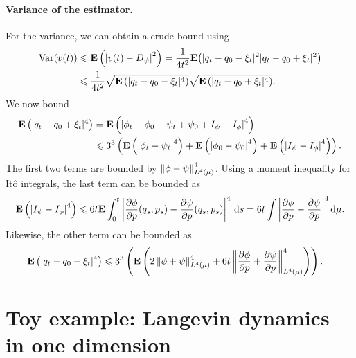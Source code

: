 \documentclass[11pt,a4paper]{article}
\newcommand{\expect}[0]{\mathbf{E}}
\renewcommand{\d}{\mathrm d}
\theoremstyle{plain}
\numberwithin{equation}{section}
\renewcommand{\leq}{\leqslant}
\begin{document}
\paragraph{Variance of the estimator.}%
For the variance, we can obtain a crude bound using
\begin{align*}
    \mathrm{Var} (v(t))
    &\leq \expect \left( \abs{v(t) - D_{\psi}}^2 \right)
    = \frac{1}{4 t^2} \expect \big( |q_t - q_0 - \xi_t|^2 |q_t - q_0 + \xi_t|^2 \big) \\
    &\leq \frac{1}{4 t^2} \sqrt{\expect \left(  |q_t - q_0 - \xi_t|^4 \right)} \sqrt{\expect \left( |q_t - q_0 + \xi_t|^4 \right)}.
\end{align*}
We now bound
\begin{align*}
    \expect \left( |q_t - q_0 + \xi_t|^4 \right)
    &= \expect \left( \abs{\phi_t - \phi_0 - \psi_t + \psi_0 + I_{\psi} - I_{\phi}}^4 \right) \\
    &\leq 3^3 \left( \expect \left( \abs{\phi_t - \psi_t}^4 \right) + \expect \left( \abs{\phi_0 - \psi_0}^4 \right) + \expect \left( \abs{I_{\psi} - I_{\phi}}^4 \right) \right).
\end{align*}
The first two terms are bounded by $\norm{\phi - \psi}_{L^4(\mu)}^4$.
Using a moment inequality for It\^o integrals, the last term can be bounded as
\[
    \expect \left( \abs{I_{\psi} - I_{\phi}}^4 \right) \leq 6 t \expect \int_{0}^{t} \abs{\derivative{1}[\phi]{p}(q_s, p_s) - \derivative{1}[\psi]{p}(q_s, p_s)}^4 \, \d s = 6 t \int \abs{\derivative{1}[\phi]{p} - \derivative{1}[\psi]{p}}^4 \d \mu.
\]
Likewise, the other term can be bounded as
\begin{align*}
    \expect \left( |q_t - q_0 - \xi_t|^4 \right)
    &\leq 3^3 \left( \expect \left( 2 \norm{\phi + \psi}[L^4(\mu)]^4 + 6 t \norm{\derivative{1}[\phi]{p} + \derivative{1}[\psi]{p}}[L^{4}(\mu)]^4 \right) \right).
\end{align*}

\section{Toy example: Langevin dynamics in one dimension}%
\label{sec:toy_example_langevin_dynamics_in_one_dimension}



\end{document}
